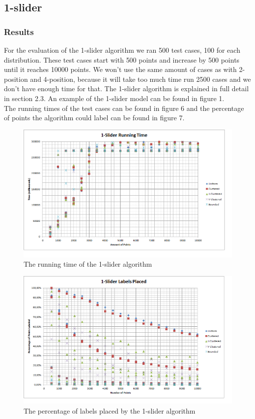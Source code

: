 \documentclass[crop=false,a4paper,oneside,11pt]{standalone}
\begin{document}
\subsection{1-slider}
\subsubsection{Results}
For the evaluation of the 1-slider algorithm we ran 500 test cases, 100 for each distribution. These test cases start with 500 points and increase by 500 points until it reaches 10000 points. We won't use the same amount of cases as with 2-position and 4-position, because it will take too much time run 2500 cases and we don't have enough time for that. The 1-slider algorithm is explained in full detail in section 2.3. An example of the 1-slider model can be found in figure 1.\\
 The running times of the test cases can be found in figure 6 and the percentage of points the algorithm could label can be found in figure 7.

 \begin{figure}[H]
 \centering
 \centerline{\includegraphics[scale = 0.65]{1slider.png}}
 \caption{The running time of the 1-slider algorithm}
 \end{figure}

 \begin{figure}[H]
 \centering
  \centerline{\includegraphics[scale = 0.65]{1sliderplaced.png}}
  \caption{The percentage of labels placed by the 1-slider algorithm}
 \end{figure}
\end{document}
